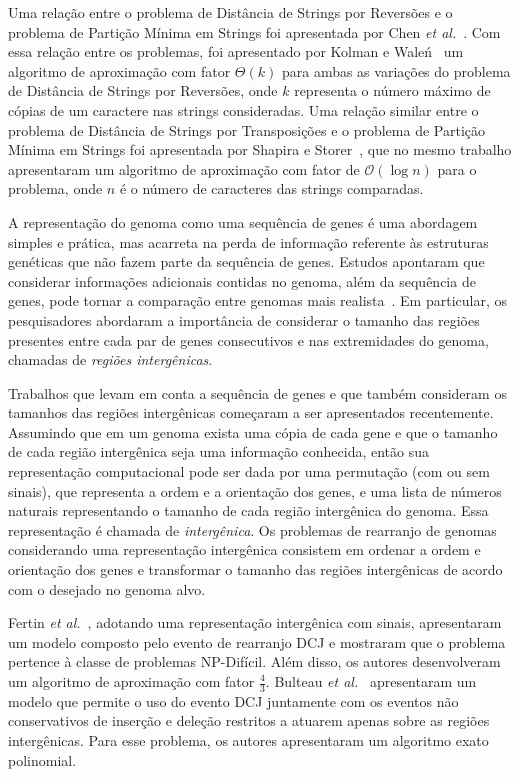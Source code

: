 Uma relação entre o problema de Distância de Strings por Reversões e o problema de Partição Mínima em Strings foi apresentada por Chen \textit{et al.}~\cite{2005-chen-etal}. Com essa relação entre os problemas, foi apresentado por Kolman e Wale{\'n}~\cite{2006-kolman-walen} um algoritmo de aproximação com fator $\Theta(k)$ para ambas as variações do problema de Distância de Strings por Reversões, onde $k$ representa o número máximo de cópias de um caractere nas strings consideradas. Uma relação similar entre o problema de Distância de Strings por Transposições e o problema de Partição Mínima em Strings foi apresentada por Shapira e Storer~\cite{2007-shapira-storer}, que no mesmo trabalho apresentaram um algoritmo de aproximação com fator de $\mathcal{O}(\log n)$ para o problema, onde $n$ é o número de caracteres das strings comparadas.

A representação do genoma como uma sequência de genes é uma abordagem simples e prática, mas acarreta na perda de informação referente às estruturas genéticas que não fazem parte da sequência de genes. Estudos apontaram que considerar informações adicionais contidas no genoma, além da sequência de genes, pode tornar a comparação entre genomas mais realista~\cite{2016a-biller-etal, 2016b-biller-etal}. Em particular, os pesquisadores abordaram a importância de considerar o tamanho das regiões presentes entre cada par de genes consecutivos e nas extremidades do genoma, chamadas de \emph{regiões intergênicas}. 

Trabalhos que levam em conta a sequência de genes e que também consideram os tamanhos das regiões intergênicas começaram a ser apresentados recentemente. Assumindo que em um genoma exista uma cópia de cada gene e que o tamanho de cada região intergênica seja uma informação conhecida, então sua representação computacional pode ser dada por uma permutação (com ou sem sinais), que representa a ordem e a orientação dos genes, e uma lista de números naturais representando o tamanho de cada região intergênica do genoma. Essa representação é chamada de \emph{intergênica}. Os problemas de rearranjo de genomas considerando uma representação intergênica consistem em ordenar a ordem e orientação dos genes e transformar o tamanho das regiões intergênicas de acordo com o desejado no genoma alvo. 

Fertin \textit{et al.}~\cite{2017-fertin-etal}, adotando uma representação intergênica com sinais, apresentaram um modelo composto pelo evento de rearranjo DCJ e mostraram que o problema pertence à classe de problemas NP-Difícil. Além disso, os autores desenvolveram um algoritmo de aproximação com fator $\frac{4}{3}$. Bulteau \textit{et al.}~\cite{2016b-bulteau-etal} apresentaram um modelo que permite o uso do evento DCJ juntamente com os eventos não conservativos de inserção e deleção restritos a atuarem apenas sobre as regiões intergênicas. Para esse problema, os autores apresentaram um algoritmo exato polinomial. 

